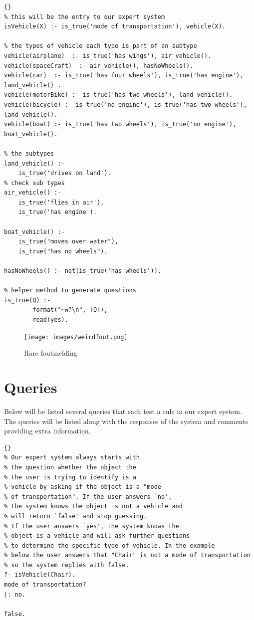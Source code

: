 \begin{lstlisting}{}
% this will be the entry to our expert system
isVehicle(X) :- is_true('mode of transportation'), vehicle(X).

% the types of vehicle each type is part of an subtype
vehicle(airplane)  :- is_true('has wings'), air_vehicle().
vehicle(spaceCraft)  :- air_vehicle(), hasNoWheels().
vehicle(car)  :- is_true('has four wheels'), is_true('has engine'), land_vehicle() .
vehicle(motorBike) :- is_true('has two wheels'), land_vehicle().
vehicle(bicycle) :- is_true('no engine'), is_true('has two wheels'), land_vehicle().
vehicle(boat) :- is_true('has two wheels'), is_true('no engine'), boat_vehicle().

% the subtypes
land_vehicle() :-
	is_true('drives on land').
% check sub types
air_vehicle() :-
	is_true('flies in air'),
	is_true('has engine').

boat_vehicle() :-
	is_true("moves over water"),
    is_true("has no wheels").

hasNoWheels() :- not(is_true('has wheels')).

% helper method to generate questions
is_true(Q) :-
        format("~w?\n", [Q]),
        read(yes).
\end{lstlisting}

\begin{figure}[!h]
  \centering
  \texttt{[image: images/weirdfout.png]}
  \caption{Rare foutmelding}
  \label{fig:rareFout}
\end{figure}{}

\newpage
\section{Queries} \label{man-queries}
Below will be listed several queries that each test a rule in our expert system.
The queries will be listed along with the responses of the system and comments
providing extra information.

\begin{lstlisting}{}
% Our expert system always starts with
% the question whether the object the
% the user is trying to identify is a
% vehicle by asking if the object is a "mode
% of transportation". If the user answers `no',
% the system knows the object is not a vehicle and
% will return `false' and stop guessing.
% If the user answers `yes', the system knows the
% object is a vehicle and will ask further questions
% to determine the specific type of vehicle. In the example
% below the user answers that "Chair" is not a mode of transportation
% so the system replies with false.
?- isVehicle(Chair).
mode of transportation?
|: no.

false.
\end{lstlisting}

